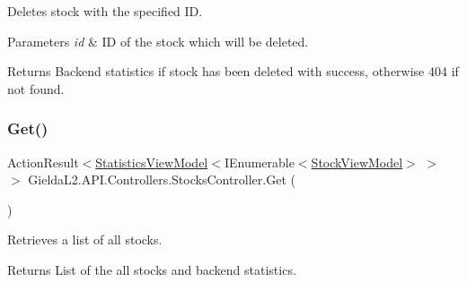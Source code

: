 Deletes stock with the specified ID. 


\begin{DoxyParams}{Parameters}
{\em id} & ID of the stock which will be deleted.\\
\hline
\end{DoxyParams}
\begin{DoxyReturn}{Returns}
Backend statistics if stock has been deleted with success, otherwise 404 if not found.
\end{DoxyReturn}
\mbox{\label{class_gielda_l2_1_1_a_p_i_1_1_controllers_1_1_stocks_controller_a3265a9c160c9a1f7f493423739f90561}} 
\subsubsection{\texorpdfstring{Get()}{Get()}\hspace{0.1cm}{\footnotesize\ttfamily [1/2]}}
{\footnotesize\ttfamily Action\+Result$<$\mbox{\hyperlink{class_gielda_l2_1_1_a_p_i_1_1_view_models_1_1_view_1_1_statistics_view_model}{Statistics\+View\+Model}}$<$I\+Enumerable$<$\mbox{\hyperlink{class_gielda_l2_1_1_a_p_i_1_1_view_models_1_1_view_1_1_stock_view_model}{Stock\+View\+Model}}$>$ $>$ $>$ Gielda\+L2.\+A\+P\+I.\+Controllers.\+Stocks\+Controller.\+Get (\begin{DoxyParamCaption}{ }\end{DoxyParamCaption})}



Retrieves a list of all stocks. 

\begin{DoxyReturn}{Returns}
List of the all stocks and backend statistics.
\end{DoxyReturn}
\mbox{\label{class_gielda_l2_1_1_a_p_i_1_1_controllers_1_1_stocks_controller_acbb679302b68f67ebfc9c22184332f27}} 
